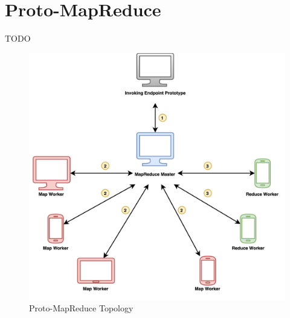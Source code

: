 \section{Proto-MapReduce}
TODO

\begin{figure}[!ht]
    \centering
    \includegraphics[scale=1.1]{document/chapters/chapter_7/images/proto_mapreduce.png}
    \caption{Proto-MapReduce Topology}
    \label{fig:proto_mapreduce}
\end{figure}